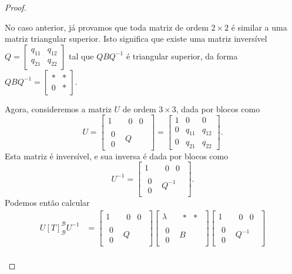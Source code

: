 \begin{proof}
\begin{itemize}
	No caso anterior, já provamos que toda matriz de ordem $2\times 2$ é similar a uma matriz triangular superior. Isto significa que existe uma matriz inversível $Q=\begin{bmatrix}q_{11}&q_{12}\\q_{21}&q_{22}\end{bmatrix}$ tal que $QBQ^{-1}$ é triangular superior, da forma $QBQ^{-1}=\begin{bmatrix}\ast&\ast\\0&\ast\end{bmatrix}$.
	
	Agora, consideremos a matriz $U$ de ordem $3\times 3$, dada por blocos como
	\[U=\begin{bmatrix}1&\begin{matrix}0&0\end{matrix}\\
	\begin{matrix}0\\0\end{matrix}&Q\end{bmatrix}=\begin{bmatrix}1&0&0\\
	0&q_{11}&q_{12}\\0&q_{21}&q_{22}\end{bmatrix}.\]
	Esta matriz é inversível, e sua inversa é dada por blocos como
	\[U^{-1}=\begin{bmatrix}1&\begin{matrix}0&0\end{matrix}\\\begin{matrix}0\\0\end{matrix}&Q^{-1}\end{bmatrix}.\]
	Podemos então calcular
	\begin{align*}
		U[T]_{\mathcal{B}}^{\mathcal{B}}U^{-1}
			&=\begin{bmatrix}1&\begin{matrix}0&0\end{matrix}\\	\begin{matrix}0\\0\end{matrix}&Q\end{bmatrix}\begin{bmatrix}\lambda&\begin{matrix}\ast&\ast\end{matrix}\\\begin{matrix}0\\0\end{matrix}&B\end{bmatrix}\begin{bmatrix}1&\begin{matrix}0&0\end{matrix}\\\begin{matrix}0\\0\end{matrix}&Q^{-1}\end{bmatrix}\\

\end{align*}
\end{itemize}
\end{proof}
